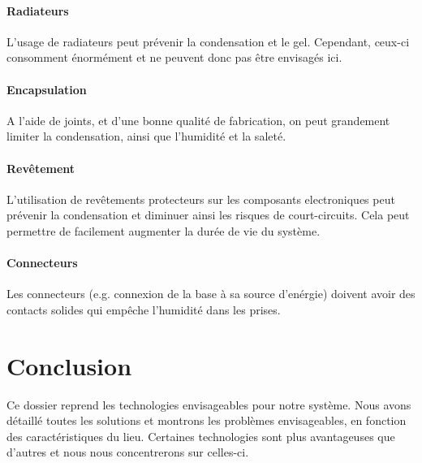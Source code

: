\paragraph{Radiateurs}

L'usage de radiateurs peut prévenir la condensation et le gel. Cependant, ceux-ci consomment énormément et ne peuvent donc pas être envisagés ici.

\paragraph{Encapsulation}

A l'aide de joints, et d'une bonne qualité de fabrication, on peut grandement limiter la condensation, ainsi que l'humidité et la saleté.

\paragraph{Revêtement}

L'utilisation de revêtements protecteurs sur les composants electroniques peut prévenir la condensation et diminuer ainsi les risques de court-circuits. Cela peut permettre de facilement augmenter la durée de vie du système.

\paragraph{Connecteurs}

Les connecteurs (e.g. connexion de la base à sa source d'enérgie) doivent avoir des contacts solides qui empêche l’humidité dans les prises.

\section{Conclusion}

Ce dossier reprend les technologies envisageables pour notre système. Nous avons détaillé toutes les solutions et montrons les problèmes envisageables, en fonction des caractéristiques du lieu. Certaines technologies sont plus avantageuses que d'autres et nous nous concentrerons sur celles-ci.